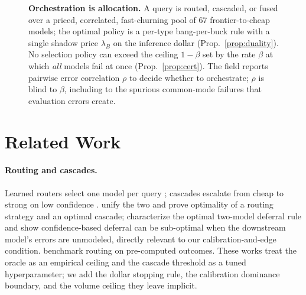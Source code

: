 \documentclass[11pt]{article}
\theoremstyle{plain}
\theoremstyle{definition}
\begin{document}
\begin{figure}[t]
{\begin{tikzpicture}
\end{tikzpicture}}
\caption{\label{fig:framework}\textbf{Orchestration is allocation.} A query is routed, cascaded, or fused over a priced,
correlated, fast-churning pool of $67$ frontier-to-cheap models; the optimal policy is a per-type bang-per-buck rule with a
single shadow price $\lambda_B$ on the inference dollar (Prop.~\ref{prop:duality}). No selection policy can exceed the ceiling
$1-\beta$ set by the rate $\beta$ at which \emph{all} models fail at once (Prop.~\ref{prop:cert}). The field reports pairwise
error correlation $\rho$ to decide whether to orchestrate; $\rho$ is blind to $\beta$, including to the spurious common-mode
failures that evaluation errors create.}
\end{figure}

\section{Related Work}\label{sec:related}
\paragraph{Routing and cascades.} Learned routers select one model per query \citep{ong2024routellm,ding2024hybridllm};
cascades escalate from cheap to strong on low confidence \citep{chen2023frugalgpt,madaan2023automix}.
\citet{dekoninck2024cascaderouting} unify the two and prove optimality of a routing strategy and an optimal cascade;
\citet{jitkrittum2023cascade} characterize the optimal two-model deferral rule and show confidence-based deferral can
be sub-optimal when the downstream model's errors are unmodeled, directly relevant to our calibration-and-edge
condition. \citet{hu2024routerbench} benchmark routing on pre-computed outcomes. These works treat the oracle as an
empirical ceiling and the cascade threshold as a tuned hyperparameter; we add the dollar stopping rule, the
calibration dominance boundary, and the volume ceiling they leave implicit.
\end{document}
